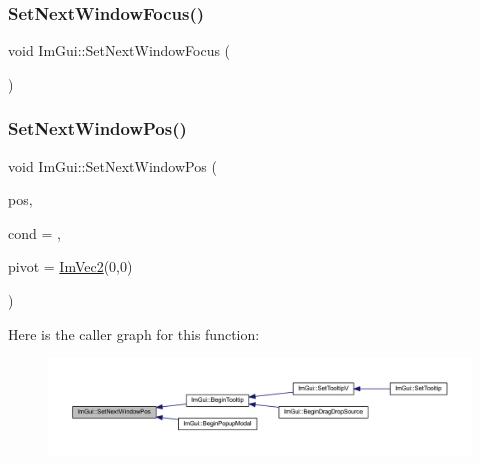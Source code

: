 \mbox{\label{namespace_im_gui_ac2d2b163c95cd8c8391aba85bc50d170}} 
\subsubsection{\texorpdfstring{Set\+Next\+Window\+Focus()}{SetNextWindowFocus()}}
{\footnotesize\ttfamily void Im\+Gui\+::\+Set\+Next\+Window\+Focus (\begin{DoxyParamCaption}{ }\end{DoxyParamCaption})}

\mbox{\label{namespace_im_gui_afbccd31113430670b5ab2bf0d6f509bf}} 
\subsubsection{\texorpdfstring{Set\+Next\+Window\+Pos()}{SetNextWindowPos()}}
{\footnotesize\ttfamily void Im\+Gui\+::\+Set\+Next\+Window\+Pos (\begin{DoxyParamCaption}\item[{const \mbox{\hyperlink{struct_im_vec2}{Im\+Vec2}} \&}]{pos,  }\item[{\mbox{\hyperlink{imgui_8h_aef890d6ac872e12c5804d0b3e4f7f103}{Im\+Gui\+Cond}}}]{cond = {},  }\item[{const \mbox{\hyperlink{struct_im_vec2}{Im\+Vec2}} \&}]{pivot = {\ttfamily \mbox{\hyperlink{struct_im_vec2}{Im\+Vec2}}(0,0)} }\end{DoxyParamCaption})}

Here is the caller graph for this function\+:
\nopagebreak
\begin{figure}[H]
\begin{center}
\leavevmode
\includegraphics[width=350pt]{namespace_im_gui_afbccd31113430670b5ab2bf0d6f509bf_icgraph}
\end{center}
\end{figure}
\mbox{\label{namespace_im_gui_ab33717bb71ef5e393ae18656fc6b229d}} 
